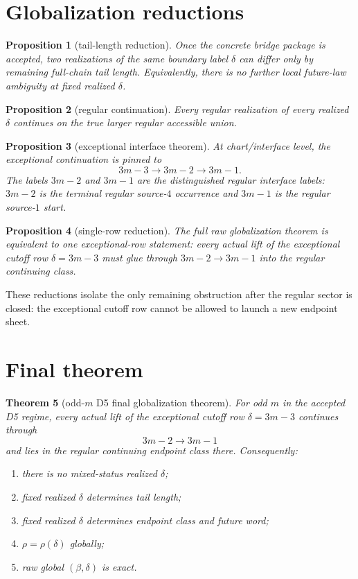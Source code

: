 \documentclass[11pt]{article}
\newtheorem{theorem}{Theorem}
\newtheorem{proposition}[theorem]{Proposition}
\begin{document}
\section{Globalization reductions}

\begin{proposition}[tail-length reduction]
Once the concrete bridge package is accepted, two realizations of the same
boundary label $\delta$ can differ only by remaining full-chain tail length.
Equivalently, there is no further local future-law ambiguity at fixed realized
$\delta$.
\end{proposition}

\begin{proposition}[regular continuation]
Every regular realization of every realized $\delta$ continues on the true
larger regular accessible union.
\end{proposition}

\begin{proposition}[exceptional interface theorem]
At chart/interface level, the exceptional continuation is pinned to
\[
3m-3 \to 3m-2 \to 3m-1.
\]
The labels $3m-2$ and $3m-1$ are the distinguished regular interface labels:
$3m-2$ is the terminal regular source-$4$ occurrence and $3m-1$ is the regular
source-$1$ start.
\end{proposition}

\begin{proposition}[single-row reduction]
The full raw globalization theorem is equivalent to one exceptional-row
statement: every actual lift of the exceptional cutoff row $\delta=3m-3$ must
glue through $3m-2\to 3m-1$ into the regular continuing class.
\end{proposition}

These reductions isolate the only remaining obstruction after the regular
sector is closed: the exceptional cutoff row cannot be allowed to launch a new
endpoint sheet.

\section{Final theorem}

\begin{theorem}[odd-$m$ D5 final globalization theorem]
For odd $m$ in the accepted D5 regime, every actual lift of the exceptional
cutoff row $\delta=3m-3$ continues through
\[
3m-2 \to 3m-1
\]
and lies in the regular continuing endpoint class there.
Consequently:
\begin{enumerate}[label=\textup{(\arabic*)},leftmargin=2.5em]
\item there is no mixed-status realized $\delta$;
\item fixed realized $\delta$ determines tail length;
\item fixed realized $\delta$ determines endpoint class and future word;
\item $\rho=\rho(\delta)$ globally;
\item raw global $(\beta,\delta)$ is exact.
\end{enumerate}
\end{theorem}
\end{document}
